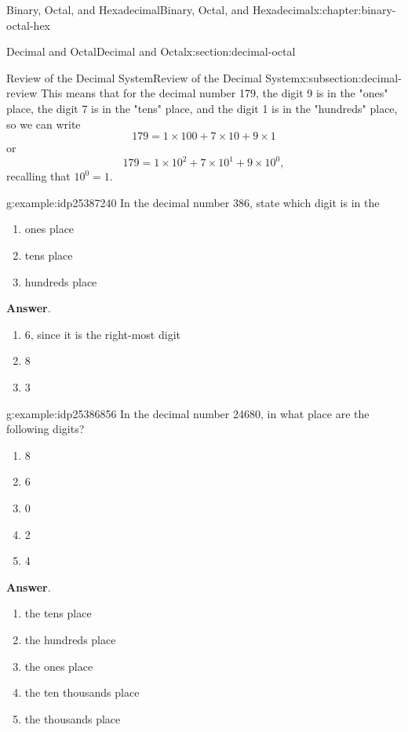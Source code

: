 \documentclass[twoside,10pt,]{book}
\newcommand{\blocktitlefont}{\relax}
\numberwithin{equation}{section}
\begin{document}
\begin{chapterptx}{Binary, Octal, and Hexadecimal}{}{Binary, Octal, and Hexadecimal}{}{}{x:chapter:binary-octal-hex}
\begin{sectionptx}{Decimal and Octal}{}{Decimal and Octal}{}{}{x:section:decimal-octal}
\begin{subsectionptx}{Review of the Decimal System}{}{Review of the Decimal System}{}{}{x:subsection:decimal-review}
This means that for the decimal number 179, the digit 9 is in the "ones" place, the digit 7 is in the "tens" place, and the digit 1 is in the "hundreds" place, so we can write%
\begin{equation*}
179=1\times 100+7\times 10+9\times 1
\end{equation*}
or%
\begin{equation*}
179=1\times 10^2+7\times 10^1+9\times 10^0,
\end{equation*}
recalling that \(10^0=1\).%
\begin{example}{}{g:example:idp25387240}%
In the decimal number 386, state which digit is in the%
\begin{enumerate}
\item{}ones place%
\item{}tens place%
\item{}hundreds place%
\end{enumerate}
%
\par\smallskip%
\noindent\textbf{\blocktitlefont Answer}.\label{g:answer:idp25393256}{}\hypertarget{g:answer:idp25393256}{}\quad{}%
\begin{enumerate}
\item{}6, since it is the right-most digit%
\item{}8%
\item{}3%
\end{enumerate}
%
\end{example}
\begin{example}{}{g:example:idp25386856}%
In the decimal number 24680, in what place are the following digits?%
\begin{enumerate}
\item{}8%
\item{}6%
\item{}0%
\item{}2%
\item{}4%
\end{enumerate}
%
\par\smallskip%
\noindent\textbf{\blocktitlefont Answer}.\label{g:answer:idp25385960}{}\hypertarget{g:answer:idp25385960}{}\quad{}%
\begin{enumerate}
\item{}the tens place%
\item{}the hundreds place%
\item{}the ones place%
\item{}the ten thousands place%
\item{}the thousands place%
\end{enumerate}

\end{example}
\end{subsectionptx}
\end{sectionptx}
\end{chapterptx}
\end{document}
